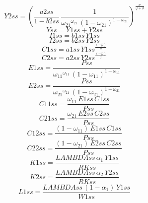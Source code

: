 \begin{dmath*}
Y2ss = \left(\frac{{a2ss}}{1-{b2ss}}\, \frac{1}{{{\omega_{21}}}^{{{\omega_{21}}}}\, \left(1-{{\omega_{21}}}\right)^{1-{{\omega_{21}}}}}\right)^{\frac{{{\sigma}}}{{{\varphi}}+{{\sigma}}}}
\end{dmath*}
\begin{dmath*}
Yss = {Y1ss}+{Y2ss}
\end{dmath*}
\begin{dmath*}
I1ss = {b1ss}\, {Y1ss}
\end{dmath*}
\begin{dmath*}
I2ss = {b2ss}\, {Y2ss}
\end{dmath*}
\begin{dmath*}
C1ss = {a1ss}\, {Y1ss}^{\frac{\left(-{{\varphi}}\right)}{{{\sigma}}}}
\end{dmath*}
\begin{dmath*}
C2ss = {a2ss}\, {Y2ss}^{\frac{\left(-{{\varphi}}\right)}{{{\sigma}}}}
\end{dmath*}
\begin{dmath*}
E1ss = \frac{{Pss}}{{{\omega_{11}}}^{{{\omega_{11}}}}\, \left(1-{{\omega_{11}}}\right)^{1-{{\omega_{11}}}}}
\end{dmath*}
\begin{dmath*}
E2ss = \frac{{Pss}}{{{\omega_{21}}}^{{{\omega_{21}}}}\, \left(1-{{\omega_{21}}}\right)^{1-{{\omega_{21}}}}}
\end{dmath*}
\begin{dmath*}
C11ss = \frac{{{\omega_{11}}}\, {E1ss}\, {C1ss}}{{Pss}}
\end{dmath*}
\begin{dmath*}
C21ss = \frac{{{\omega_{21}}}\, {E2ss}\, {C2ss}}{{Pss}}
\end{dmath*}
\begin{dmath*}
C12ss = \frac{\left(1-{{\omega_{11}}}\right)\, {E1ss}\, {C1ss}}{{Pss}}
\end{dmath*}
\begin{dmath*}
C22ss = \frac{\left(1-{{\omega_{21}}}\right)\, {E2ss}\, {C2ss}}{{Pss}}
\end{dmath*}
\begin{dmath*}
K1ss = \frac{{LAMBDAss}\, {{\alpha_{1}}}\, {Y1ss}}{{RKss}}
\end{dmath*}
\begin{dmath*}
K2ss = \frac{{LAMBDAss}\, {{\alpha_{2}}}\, {Y2ss}}{{RKss}}
\end{dmath*}
\begin{dmath*}
L1ss = \frac{{LAMBDAss}\, \left(1-{{\alpha_{1}}}\right)\, {Y1ss}}{{W1ss}}
\end{dmath*}
